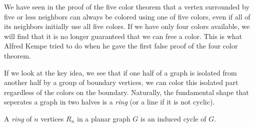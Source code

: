 We have seen in the proof of the five color theorem that a vertex surrounded by five or less neighbors can always be colored using one of five colors, even if all of its neighbors initially use all five colors. If we have only four colors available, we will find that it is no longer guaranteed that we can free a color. This is what Alfred Kempe tried to do when he gave the first false proof of the four color theorem.

If we look at the key idea, we see that if one half of a graph is isolated from another half by a group of boundary vertices, we can color this isolated part regardless of the colors on the boundary. Naturally, the fundamental shape that seperates a graph in two halves is a \textit{ring} (or a line if it is not cyclic).

\begin{definition}
    A \emph{ring} of $n$ vertices $R_n$ in a planar graph $G$ is an induced cycle of $G$.
\end{definition}

